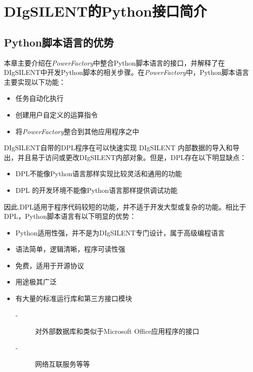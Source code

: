 \chapter{DIgSILENT的Python接口简介}

\section{Python脚本语言的优势}

本章主要介绍在\emph{PowerFactory}中整合Python脚本语言的接口，并解释了在DIgSILENT中开发Python脚本的相关步骤。在\emph{PowerFactory}中，Python脚本语言主要实现以下功能：

\begin{itemize}
\item 任务自动化执行
\item 创建用户自定义的运算指令
\item 将\emph{PowerFactory}整合到其他应用程序之中
\end{itemize}

DIgSILENT自带的DPL程序在可以快速实现 DIgSILENT 内部数据的导入和导出，并且易于访问或更改DIgSILENT内部对象。但是，DPL存在以下明显缺点：

\begin{itemize}
\item DPL不能像Python语言那样实现比较灵活和通用的功能
\item DPL 的开发环境不能像Python语言那样提供调试功能
\end{itemize}

因此,DPL适用于程序代码较短的功能，并不适于开发大型或复杂的功能。相比于DPL，Python脚本语言有以下明显的优势：

\begin{itemize}
\item Python适用性强，并不是为DIgSILENT专门设计，属于高级编程语言
\item 语法简单，逻辑清晰，程序可读性强
\item 免费，适用于开源协议
\item 用途极其广泛
\item 有大量的标准运行库和第三方接口模块

	\begin{description}
	\item[-] 对外部数据库和类似于Microsoft Office应用程序的接口
	\item[-] 网络互联服务等等
	\end{description}

\end{itemize}

